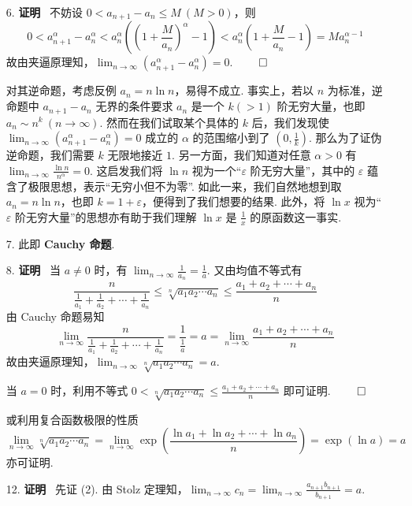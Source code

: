 \documentclass[11pt,oneside,fontset=fandol]{ctexbook} %
\begin{document}
\begin{enumerate}
    \item[6.]
    \textbf{证明} \ 不妨设 $0 <
    a_{n+1}-a_n \leqslant M \ (M>0)$，则
    \[
        0 < a_{n+1}^{\alpha}-a_n^{\alpha} < a_n^{\alpha}\left((1+\frac M
        {a_n})^{\alpha} - 1 \right) < a_n^{\alpha}\left( 1 + \frac M {a_n} - 1 \right) = M a_n^{\alpha-1}
    \]
    故由夹逼原理知，$\lim_{n \to \infty} \left(a_{n+1}^{\alpha}-a_n^{\alpha}\right) = 0$.
    $\hfill\qed$

    对其逆命题，考虑反例 $a_n = n \ln n$，易得不成立. 事实上，若以 $n$ 为标准，逆命题中 $a_{n+1} - a_n$ 无界的条件要求 $a_n$ 是一个 $k (> 1)$ 阶无穷大量，也即 $a_n \sim n^k \ (n \to \infty)$. 然而在我们试取某个具体的 $k$ 后，我们发现使 $\lim_{n \to \infty} \left(a_{n+1}^{\alpha}-a_n^{\alpha}\right) = 0$ 成立的 $\alpha$ 的范围缩小到了 $(0, \frac 1 k)$. 那么为了证伪逆命题，我们需要 $k$ 无限地接近 $1$. 另一方面，我们知道对任意 $\alpha > 0$ 有 $\lim_{n \to \infty} \frac{\ln n}{n^\alpha} = 0$. 这启发我们将 $\ln n$ 视为一个“$\varepsilon$ 阶无穷大量”，其中的 $\varepsilon$ 蕴含了极限思想，表示“无穷小但不为零”. 如此一来，我们自然地想到取 $a_n = n \ln n$，也即 $k = 1 + \varepsilon$，便得到了我们想要的结果. 此外，将 $\ln x$ 视为“$\varepsilon$ 阶无穷大量”的思想亦有助于我们理解 $\ln x$ 是 $\frac 1 x$ 的原函数这一事实.
    \item[7.]
    此即 \textbf{Cauchy 命题}.
    \item[8.]
    \textbf{证明} \ 当 $a \neq 0$ 时，有 $\lim_{n \to \infty} \frac 1 {a_n} = \frac 1 a$. 又由均值不等式有
    \[
        \frac{n}{\frac 1 {a_1} + \frac 1 {a_2} + \cdots + \frac 1 {a_n}} \leqslant \sqrt[n]{a_1a_2\cdots a_n} \leqslant \frac {a_1+a_2+\cdots+a_n} n
    \]
    由 Cauchy 命题易知
    \[
        \lim_{n \to \infty} \frac{n}{\frac 1 {a_1} + \frac 1 {a_2} + \cdots + \frac 1 {a_n}} = \frac 1 {\frac 1 a} = a = \lim_{n \to \infty} \frac {a_1+a_2+\cdots+a_n} n
    \]
    故由夹逼原理知，$\lim_{n \to \infty} \sqrt[n]{a_1a_2\cdots a_n} = a$.
    
    当 $a = 0$ 时，利用不等式 $0 < \sqrt[n]{a_1a_2\cdots a_n} \leqslant \frac {a_1+a_2+\cdots+a_n} n$ 即可证明.
    $\hfill\qed$

    或利用复合函数极限的性质
    \[
        \lim_{n \to \infty} \sqrt[n]{a_1 a_2 \cdots a_n} = \lim_{n \to \infty} \exp\left( \frac {\ln a_1 + \ln a_2 + \cdots + \ln a_n} n \right) = \exp(\ln a) = a
    \]
    亦可证明.
    \item[12.]
    \textbf{证明} \ 先证 (2). 由 Stolz 定理知，$\lim_{n \to \infty} c_n = \lim_{n\to \infty} \frac{a_{n+1}b_{n+1}}{b_{n+1}} = a$.


\end{enumerate}
\end{document}
